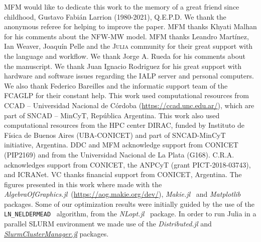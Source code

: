 \documentclass[twocolumn]{aa}
\begin{document}
\begin{acknowledgements}
    MFM would like to dedicate this work to the memory of a great friend since childhood, Gustavo Fabián Larrion (1980-2021), Q.E.P.D.
    We thank the anonymous referee for helping to improve the paper.
    MFM thanks Khyati Malhan for his comments about the NFW-MW model.
    MFM thanks Leandro Martínez, Ian Weaver, Joaquín Pelle and the \textsc{Julia} community for their
    great support with the language and workflow. We thank Jorge A. Rueda for his comments
    about the manuscript.
    We thank Juan Ignacio Rodriguez for his great support with hardware and software issues regarding the IALP server and personal computers. We also thank Federico Bareilles and the informatic support team of the FCAGLP for their constant help.
    This work used computational resources from CCAD – Universidad
    Nacional de Córdoba (\href{https://ccad.unc.edu.ar/}{https://ccad.unc.edu.ar/}),
    which are part of SNCAD – MinCyT, República Argentina.
    This work also used computational resources from the HPC center DIRAC,
    funded by Instituto de Física de Buenos Aires (UBA-CONICET) and part of SNCAD-MinCyT initiative, Argentina.
    DDC and MFM acknowledge support from CONICET (PIP2169) and from the Universidad Nacional de La Plata (G168). C.R.A. acknowledges support from CONICET, the ANPCyT (grant PICT-2018-03743), and ICRANet. VC thanks financial support from CONICET, Argentina.
    The figures presented in this work where made with the
    {\it AlgebraOfGraphics.jl}~(\href{https://aog.makie.org/dev/}{https://aog.makie.org/dev/}),
    {\it Makie.jl}~\citep{DanischKrumbiegel2021} and {\it Matplotlib}~\citep{Hunter:2007}
    packages. Some of our optimization results were initially guided by the use of the \texttt{LN\_NELDERMEAD}~\citep{NELDERMEAD,10.1093/comjnl/8.1.42,shere} algorithm, from the {\it NLopt.jl}~\citep{NLopt} package.
    In order to run {\sc Julia} in a parallel SLURM environment we made use of the {\it Distributed.jl} and \href{https://github.com/kleinhenz/SlurmClusterManager.jl}{\it SlurmClusterManager.jl} packages.
\end{acknowledgements}

%
%
%
\end{document}
